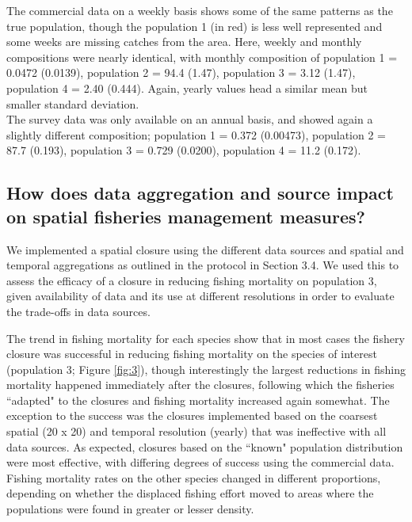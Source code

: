\documentclass[review]{elsarticle}
\begin{document}
The commercial data on a weekly basis shows some of the same patterns as the
true population, though the population 1 (in red) is less well represented and
some weeks are missing catches from the area. Here, weekly and monthly
compositions were nearly identical, with monthly composition of population 1 =
0.0472 (0.0139), population 2 = 94.4 (1.47), population 3 = 3.12 (1.47), population 4 =
2.40 (0.444). Again, yearly values head a similar mean but smaller standard
deviation.\\

The survey data was only available on an annual basis, and showed again a
slightly different composition; population 1 = 0.372 (0.00473), population 2 = 87.7
(0.193), population 3 = 0.729 (0.0200), population 4 = 11.2 (0.172).

\subsection{How does data aggregation and source impact on spatial fisheries
	management measures?}

We implemented a spatial closure using the different data sources and spatial
and temporal aggregations as outlined in the protocol in Section 3.4. We used
this to assess the efficacy of a closure in reducing fishing mortality on
population 3, given availability of data and its use at different resolutions in
order to evaluate the trade-offs in data sources. 

The trend in fishing mortality for each species show that in most cases the
fishery closure was successful in reducing fishing mortality on the species of
interest (population 3; Figure \ref{fig:3}), though interestingly the largest
reductions in fishing mortality happened immediately after the closures,
following which the fisheries ``adapted" to the closures and fishing mortality
increased again somewhat. The exception to the success was the closures
implemented based on the coarsest spatial (20 x 20) and temporal resolution
(yearly) that was ineffective with all data sources. As expected, closures
based on the ``known" population distribution were most effective, with
differing degrees of success using the commercial data. Fishing mortality rates
on the other species changed in different proportions, depending on whether the
displaced fishing effort moved to areas where the populations were found in
greater or lesser density. \\
\end{document}
